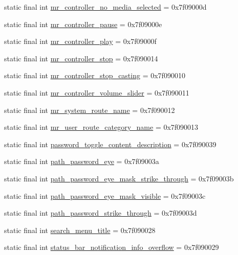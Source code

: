 \begin{CompactItemize}
\item 
static final int \hyperlink{classandroid_1_1support_1_1v4_1_1_r_1_1string_b8fb283c95242e45941f9ffa6a3cb298}{mr\_\-controller\_\-no\_\-media\_\-selected} = 0x7f09000d
\item 
static final int \hyperlink{classandroid_1_1support_1_1v4_1_1_r_1_1string_471152a1cc2231d4654bdea3ffc941ea}{mr\_\-controller\_\-pause} = 0x7f09000e
\item 
static final int \hyperlink{classandroid_1_1support_1_1v4_1_1_r_1_1string_a11134bcf14c14a0b064106fd5aea46f}{mr\_\-controller\_\-play} = 0x7f09000f
\item 
static final int \hyperlink{classandroid_1_1support_1_1v4_1_1_r_1_1string_dbd3fd864f87d49e93e84b51365ea98f}{mr\_\-controller\_\-stop} = 0x7f090014
\item 
static final int \hyperlink{classandroid_1_1support_1_1v4_1_1_r_1_1string_2fc0288729df8debaeb04d48db54f357}{mr\_\-controller\_\-stop\_\-casting} = 0x7f090010
\item 
static final int \hyperlink{classandroid_1_1support_1_1v4_1_1_r_1_1string_9eae3dc32e378caf4e6fa9db4e756e2b}{mr\_\-controller\_\-volume\_\-slider} = 0x7f090011
\item 
static final int \hyperlink{classandroid_1_1support_1_1v4_1_1_r_1_1string_34bbd2c2eee79ff5b4160a8a0fe049ba}{mr\_\-system\_\-route\_\-name} = 0x7f090012
\item 
static final int \hyperlink{classandroid_1_1support_1_1v4_1_1_r_1_1string_e2c1c2962b0b7a5ff0beef19f3a7cdaf}{mr\_\-user\_\-route\_\-category\_\-name} = 0x7f090013
\item 
static final int \hyperlink{classandroid_1_1support_1_1v4_1_1_r_1_1string_3d7dd9c534115361032b856c650dce10}{password\_\-toggle\_\-content\_\-description} = 0x7f090039
\item 
static final int \hyperlink{classandroid_1_1support_1_1v4_1_1_r_1_1string_e9094345be740fee2f1d2eb26b0043d9}{path\_\-password\_\-eye} = 0x7f09003a
\item 
static final int \hyperlink{classandroid_1_1support_1_1v4_1_1_r_1_1string_8897abf99855c0dd8e1c3c4a40094984}{path\_\-password\_\-eye\_\-mask\_\-strike\_\-through} = 0x7f09003b
\item 
static final int \hyperlink{classandroid_1_1support_1_1v4_1_1_r_1_1string_1a098a28834230bc4efeceebed7a1e68}{path\_\-password\_\-eye\_\-mask\_\-visible} = 0x7f09003c
\item 
static final int \hyperlink{classandroid_1_1support_1_1v4_1_1_r_1_1string_758f4be2891521f05b60e15ef76e1811}{path\_\-password\_\-strike\_\-through} = 0x7f09003d
\item 
static final int \hyperlink{classandroid_1_1support_1_1v4_1_1_r_1_1string_32d6e664a18f5b4c8fbfb966bfba6bef}{search\_\-menu\_\-title} = 0x7f090028
\item 
static final int \hyperlink{classandroid_1_1support_1_1v4_1_1_r_1_1string_3d73902bdc5d92717a79dd0c37e7c986}{status\_\-bar\_\-notification\_\-info\_\-overflow} = 0x7f090029
\end{CompactItemize}


